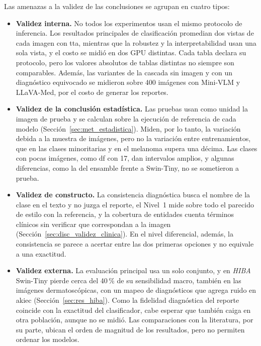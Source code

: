 Las amenazas a la validez de las conclusiones se agrupan en cuatro tipos:
\begin{itemize}
    \item \textbf{Validez interna.} No todos los experimentos usan el mismo protocolo de inferencia. Los resultados
    principales de clasificación promedian dos vistas de cada imagen con \gls{tta}, mientras que la robustez y la
    interpretabilidad usan una sola vista, y el costo se midió en dos GPU distintas. Cada tabla declara su protocolo,
    pero los valores absolutos de tablas distintas no siempre son comparables. Además, las variantes de la cascada sin
    imagen y con un diagnóstico equivocado se midieron sobre 400 imágenes con Mini-VLM y LLaVA-Med, por el costo de
    generar los reportes.
    \item \textbf{Validez de la conclusión estadística.} Las pruebas usan como unidad la imagen de prueba y se
    calculan sobre la ejecución de referencia de cada modelo (Sección~\ref{sec:met_estadistica}). Miden, por lo
    tanto, la variación debida a la muestra de imágenes, pero no la variación entre entrenamientos, que en las clases
    minoritarias y en el melanoma supera una décima. Las clases con pocas imágenes, como \gls{df} con 17, dan
    intervalos amplios, y algunas diferencias, como la del ensamble frente a Swin-Tiny, no se sometieron a prueba.
    \item \textbf{Validez de constructo.} La consistencia diagnóstica busca el nombre de la clase en el texto y no
    juzga el reporte, el Nivel~1 mide sobre todo el parecido de estilo con la referencia, y la cobertura de entidades
    cuenta términos clínicos sin verificar que correspondan a la imagen (Sección~\ref{sec:disc_validez_clinica}). En
    el nivel diferencial, además, la consistencia se parece a acertar entre las dos primeras opciones y no equivale
    a una exactitud.
    \item \textbf{Validez externa.} La evaluación principal usa un solo conjunto, y en \emph{HIBA} Swin-Tiny pierde
    cerca del 40\,\% de su sensibilidad macro, también en las imágenes dermatoscópicas, con un mapeo de diagnósticos
    que agrega ruido en \gls{akiec} (Sección~\ref{sec:res_hiba}). Como la fidelidad diagnóstica del reporte coincide
    con la exactitud del clasificador, cabe esperar que también caiga en otra población, aunque no se midió. Las
    comparaciones con la literatura, por su parte, ubican el orden de magnitud de los resultados, pero no permiten
    ordenar los modelos.
\end{itemize}

